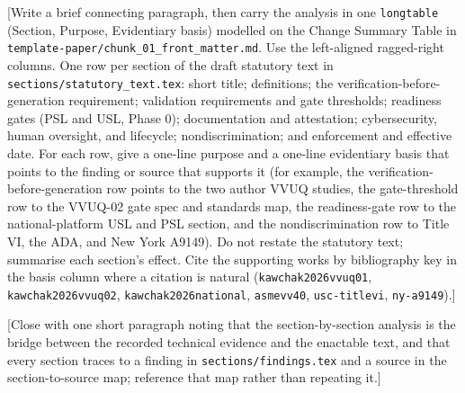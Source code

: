 
[Write a brief connecting paragraph, then carry the analysis in one
\texttt{longtable} (Section, Purpose, Evidentiary basis) modelled on the Change
Summary Table in \texttt{template-paper/chunk\_01\_front\_matter.md}. Use the
left-aligned ragged-right columns. One row per section of the draft statutory text
in \texttt{sections/statutory\_text.tex}: short title; definitions; the
verification-before-generation requirement; validation requirements and gate
thresholds; readiness gates (PSL and USL, Phase 0); documentation and attestation;
cybersecurity, human oversight, and lifecycle; nondiscrimination; and enforcement
and effective date. For each row, give a one-line purpose and a one-line
evidentiary basis that points to the finding or source that supports it (for
example, the verification-before-generation row points to the two author VVUQ
studies, the gate-threshold row to the VVUQ-02 gate spec and standards map, the
readiness-gate row to the national-platform USL and PSL section, and the
nondiscrimination row to Title VI, the ADA, and New York A9149). Do not restate
the statutory text; summarise each section's effect. Cite the supporting works by
bibliography key in the basis column where a citation is natural
(\texttt{kawchak2026vvuq01}, \texttt{kawchak2026vvuq02}, \texttt{kawchak2026national},
\texttt{asmevv40}, \texttt{usc-titlevi}, \texttt{ny-a9149}).]

[Close with one short paragraph noting that the section-by-section analysis is the
bridge between the recorded technical evidence and the enactable text, and that
every section traces to a finding in \texttt{sections/findings.tex} and a source
in the section-to-source map; reference that map rather than repeating it.]

